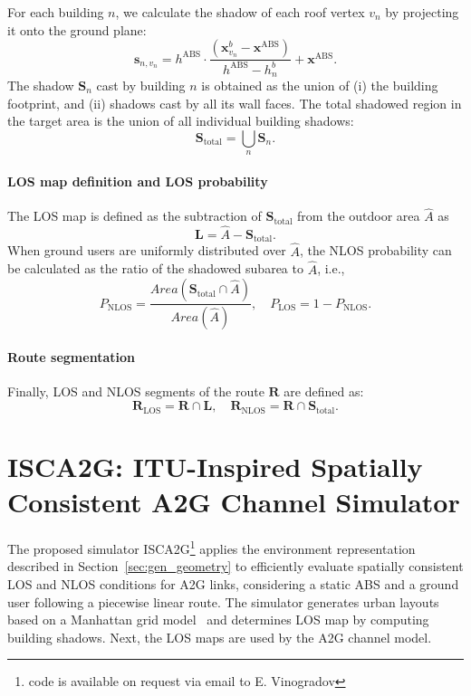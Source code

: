\documentclass[10pt,conference]{IEEEtran}
\begin{document}
For each building $n$, we calculate the shadow of each roof vertex $v_n$ by projecting it onto the ground plane:
\begin{equation}\label{eq:shadow_vertex}
	\mathbf{s}_{n,v_n} = h^{\text{ABS}} \cdot \frac{(\mathbf{x}_{v_n}^b - \mathbf{x}^{\text{ABS}})}{h^{\text{ABS}} - h_{n}^b} + \mathbf{x}^{\text{ABS}}.
\end{equation}
{The shadow $\mathbf{S}_n$ cast by building $n$ is obtained as the union of (i) the building footprint, and (ii) shadows cast by all its wall faces.} The total shadowed region in the target area is the union of all individual building shadows:
\begin{equation}\label{eq:shadow_total}
	\mathbf{S}_{\text{total}} = \bigcup_{n} \mathbf{S}_n.
\end{equation}

\paragraph{LOS map definition and LOS probability}
The LOS map is defined as the subtraction of $\mathbf{S}_{\text{total}}$ from the outdoor area $\hat{A}$ as
\begin{equation}\label{eq:LOS map}
	\mathbf{L}= \hat{A} - \mathbf{S}_{\text{total}}.
\end{equation}
When ground users are uniformly distributed over $\hat{A}$, the NLOS probability can be calculated as the ratio of the shadowed subarea to $\hat{A}$, i.e.,
$$
P_{\text{NLOS}} = \frac{Area(\mathbf{S}_{\text{total}} \cap \hat{A})}{Area(\hat{A})},\quad P_{\text{LOS}}=1-P_{\text{NLOS}}.
$$

\paragraph{Route segmentation}
Finally, LOS and NLOS segments of the route $\mathbf{R}$ are defined as:
\begin{equation}\label{eq:NLOS}
	\mathbf{R}_{\text{LOS}} = \mathbf{R} \cap \mathbf{L},\quad \mathbf{R}_{\text{NLOS}} = \mathbf{R} \cap \mathbf{S}_{\text{total}} .
\end{equation}


\section{ISCA2G: ITU-Inspired Spatially Consistent A2G Channel Simulator}\label{sec:Manhattan_sim}

The proposed simulator ISCA2G\footnote{code is available on request via email to E. Vinogradov} applies the environment representation described in Section~\ref{sec:gen_geometry} to efficiently evaluate spatially consistent LOS and NLOS conditions for A2G links, considering a static ABS and a ground user following a piecewise linear route. The simulator generates urban layouts based on a Manhattan grid model~\cite{ITU} and determines LOS map by computing building shadows. Next, the LOS maps are used by the A2G channel model.
\end{document}
